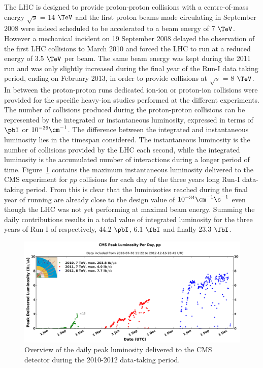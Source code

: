 The LHC is  designed to provide proton-proton collisions with a centre-of-mass energy $\sqrt{s}$ = 14 $\TeV$ and the first proton beams made circulating in September 2008 were indeed scheduled to be accelerated to a beam energy of 7 $\TeV$. However a mechanical incident on 19 September 2008 delayed the observation of the first LHC collisions to March 2010 and forced the LHC to run at a reduced energy of 3.5 $\TeV$ per beam. The same beam energy was kept during the 2011 run and was only slightly increased during the final year of the Run-I data taking period, ending on February 2013, in order to provide collisions at $\sqrt{s}$ = 8 $\TeV$. In between the proton-proton runs dedicated ion-ion or proton-ion collisions were provided for the specific heavy-ion studies performed at the different experiments.
\\
The number of collisions produced during the proton-proton collisions can be represented by the integrated or instantaneous luminosity, expressed in terms of $\pbI$ or $10^{-36} \cm^{-1}$. The difference between the integrated and instantaneous luminosity lies in the timespan considered. The instantaneous luminosity is the number of collisions provided by the LHC each second, while the integrated luminosity is the accumulated number of interactions during a longer period of time. Figure~\ref{fig::InstLumi} contains the maximum instantaneous luminosity delivered to the CMS experiment for $pp$ collisions for each day of the three years long Run-I data-taking period.
From this is clear that the luminisoties reached during the final year of running are already close to the design value of $10^{-34} \cm^{-1} \s^{-1}$ even though the LHC was not yet performing at maximal beam energy.
Summing the daily contributions results in a total value of integrated luminosity for the three years of Run-I of respectively, 44.2 $\pbI$, 6.1 $\fbI$ and finally 23.3 $\fbI$.
\begin{figure}[h!t]
 \centering
 \includegraphics[width = 0.95 \textwidth]{Chapters/Chapter2_CERN/Figures/InstanteneousLumi_FullRunI.png}
 \caption{Overview of the daily peak luminosity delivered to the CMS detector during the 2010-2012 data-taking period.} 
 \label{fig::InstLumi}
\end{figure}

